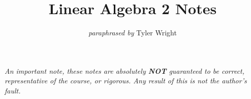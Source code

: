 \documentclass[a4paper, 12pt, twoside]{article}
\begin{document}
\title{Linear Algebra 2 Notes}
\date{}
\author{\textit{paraphrased by} Tyler Wright}
\maketitle

\vfill

\textit{An important note, these notes are absolutely \textbf{NOT}
  guaranteed to be correct, representative of the course, or rigorous.
  Any result of this is not the author's fault.}

\addtocounter{section}{-1}



\newpage

\tableofcontents













\end{document}
